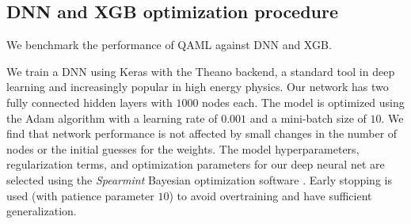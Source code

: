 %
%

\subsection{DNN and XGB optimization procedure}

We benchmark the performance of QAML against DNN and XGB.

We train a DNN using Keras \cite{keras} with the Theano backend,\cite{2016arXiv160502688full} a standard tool in deep learning and increasingly popular in high energy physics. Our network has two fully connected hidden layers with $1000$ nodes each. The model is optimized using the Adam algorithm \cite{DBLP:journals/corr/KingmaB14} with a learning rate of $0.001$ and a mini-batch size of $10$. We find that network performance is not  affected by small changes in the number of nodes or the initial guesses for the weights. The model hyperparameters, regularization terms, and optimization parameters for our deep neural net are selected using the {\it Spearmint} Bayesian optimization software \cite{1206.2944S,JasperSnoek}. Early stopping is used (with patience parameter $10$) to avoid overtraining and have sufficient generalization.


